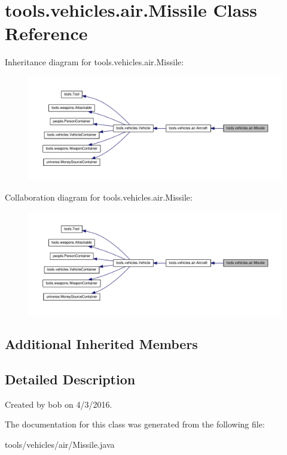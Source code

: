\hypertarget{classtools_1_1vehicles_1_1air_1_1_missile}{}\section{tools.\+vehicles.\+air.\+Missile Class Reference}
\label{classtools_1_1vehicles_1_1air_1_1_missile}


Inheritance diagram for tools.\+vehicles.\+air.\+Missile\+:\nopagebreak
\begin{figure}[H]
\begin{center}
\leavevmode
\includegraphics[width=350pt]{classtools_1_1vehicles_1_1air_1_1_missile__inherit__graph}
\end{center}
\end{figure}


Collaboration diagram for tools.\+vehicles.\+air.\+Missile\+:\nopagebreak
\begin{figure}[H]
\begin{center}
\leavevmode
\includegraphics[width=350pt]{classtools_1_1vehicles_1_1air_1_1_missile__coll__graph}
\end{center}
\end{figure}
\subsection*{Additional Inherited Members}


\subsection{Detailed Description}
Created by bob on 4/3/2016. 

The documentation for this class was generated from the following file\+:\begin{DoxyCompactItemize}
\item 
tools/vehicles/air/Missile.\+java\end{DoxyCompactItemize}
